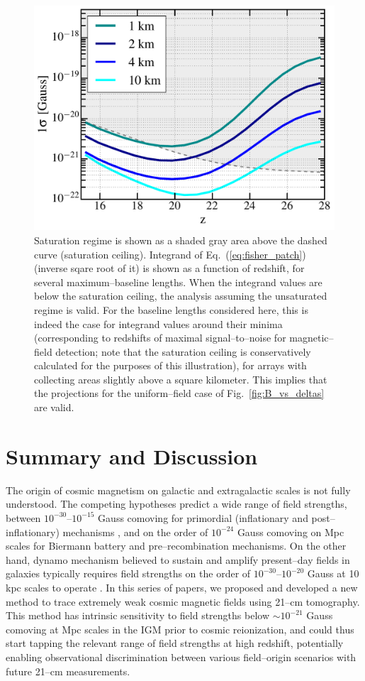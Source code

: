 \documentclass[aps,prd,twocolumn,floatfix,showpacs,superscriptaddress,nofootinbib]{revtex4-1}
\newcommand{\eq}[1]{{Eq.~(#1)}}
\begin{document}
\begin{figure}
\centering
\includegraphics[width=.4\textwidth,keepaspectratio=true]{sigmaB0_vs_z.pdf}
\caption{Saturation regime is shown as a shaded gray area above the dashed curve (saturation ceiling). Integrand of \eq{\ref{eq:fisher_patch}} (inverse sqare root of it) is shown as a function of redshift, for several maximum--baseline lengths.  When the integrand values are below the saturation ceiling, the analysis assuming the unsaturated regime is valid. For the baseline lengths considered here, this is indeed the case for integrand values around their minima (corresponding to redshifts of maximal signal--to--noise for magnetic--field detection; note that the saturation ceiling is conservatively calculated for the purposes of this illustration), for arrays with collecting areas slightly above a square kilometer. This implies that the projections for the uniform--field case of Fig.~\ref{fig:B_vs_deltas} are valid. \label{fig:Bsat}}
\end{figure}

\section{Summary and Discussion}
\label{sec:conclusions}

The origin of cosmic magnetism on galactic and extragalactic scales is not fully understood. The competing hypotheses predict a wide range of field strengths, between $10^{-30}$--$10^{-15}$ Gauss comoving for primordial (inflationary and post--inflationary) mechanisms \cite{2013A&ARv..21...62D,2014JCAP...05..040K}, and on the order of $10^{-24}$ Gauss comoving on Mpc scales for Biermann battery \cite{Naoz13} and pre--recombination \cite{2006Sci...311..827I} mechanisms. On the other hand, dynamo mechanism believed to sustain and amplify present--day fields in galaxies typically requires field strengths on the order of $10^{-30}$--$10^{-20}$ Gauss at 10 kpc scales to operate \cite{2001PhLB..501..165D,2002RvMP...74..775W,2006Sci...311..827I}. In this series of papers, we proposed and developed a new method to trace extremely weak cosmic magnetic fields using 21--cm tomography. This method has intrinsic sensitivity to field strengths below $\sim$$10^{-21}$ Gauss comoving at Mpc scales in the IGM prior to cosmic reionization, and could thus start tapping the relevant range of field strengths at high redshift, potentially enabling observational discrimination between various field--origin scenarios with future 21--cm measurements.
\end{document}
